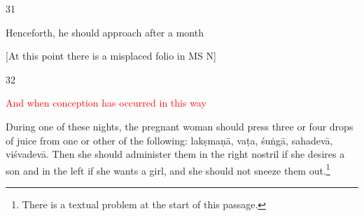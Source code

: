 \begin{translation}
        
 \item [31]

Henceforth, he should approach after a month

[At this point there is a misplaced folio in MS N]
  
\item[32] 

\textcolor{red}{And when conception has occurred in this 
way}\q{\textcolor{red}{Problematic 
passage in the edition.}}

During one of these nights, the pregnant woman should press three or
four drops of juice from one or other of the following:
\gls{lakṣmaṇā}, \gls{vaṭa}, \gls{śuṅgā}, \gls{sahadevā},
\gls{viśvadevā}. Then she should administer them in the right nostril if she
desires a son and in the left if she wants a girl, and she should not
sneeze them out.\footnote{There is a textual problem at the start of this 
passage.}


%
%    
%
%
%
%
%
%
%
%
%
%
%
%


\end{translation}
